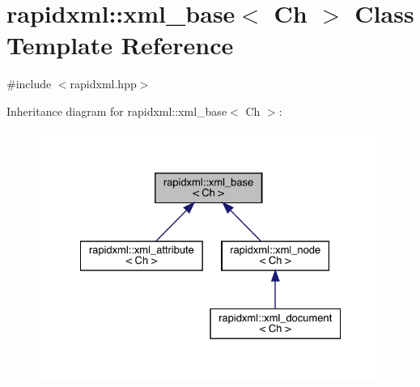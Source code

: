 \hypertarget{classrapidxml_1_1xml__base}{}\section{rapidxml\+::xml\+\_\+base$<$ Ch $>$ Class Template Reference}
\label{classrapidxml_1_1xml__base}


{\ttfamily \#include $<$rapidxml.\+hpp$>$}



Inheritance diagram for rapidxml\+::xml\+\_\+base$<$ Ch $>$\+:\nopagebreak
\begin{figure}[H]
\begin{center}
\leavevmode
\includegraphics[width=328pt]{classrapidxml_1_1xml__base__inherit__graph}
\end{center}
\end{figure}
